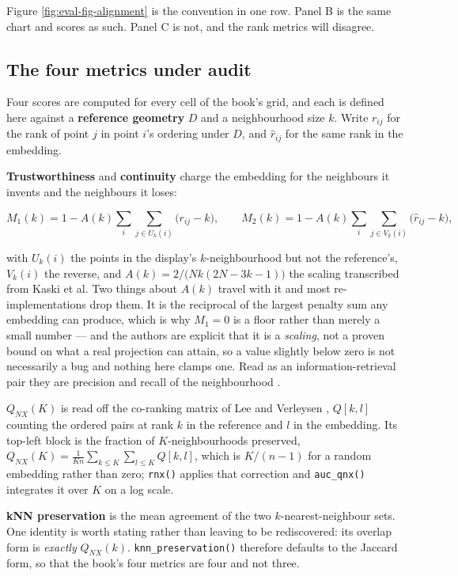 \documentclass[
  british,
  a4paper,
]{book}
\begin{document}
Figure \ref{fig:eval-fig-alignment} is the convention in one row. Panel B is
the same chart and scores as such. Panel C is not, and the rank metrics will
disagree.

\subsection{The four metrics under audit}\label{the-four-metrics-under-audit}

Four scores are computed for every cell of the book's grid, and each is defined
here against a \textbf{reference geometry} \(D\) and a neighbourhood size \(k\). Write
\(r_{ij}\) for the rank of point \(j\) in point \(i\)'s ordering under \(D\), and
\(\hat r_{ij}\) for the same rank in the embedding.

\textbf{Trustworthiness} and \textbf{continuity} \citep{venna2001neighborhood, kaski2003trustworthiness} charge the embedding for the neighbours it invents
and the neighbours it loses:

\[M_1(k) = 1 - A(k)\sum_{i}\sum_{j \in U_k(i)}\big(r_{ij} - k\big), \qquad
  M_2(k) = 1 - A(k)\sum_{i}\sum_{j \in V_k(i)}\big(\hat r_{ij} - k\big),\]

with \(U_k(i)\) the points in the display's \(k\)-neighbourhood but not the
reference's, \(V_k(i)\) the reverse, and
\(A(k) = 2 / \big(Nk(2N - 3k - 1)\big)\) the scaling transcribed from Kaski et al.
Two things about \(A(k)\) travel with it and most re-implementations drop them.
It is the reciprocal of the largest penalty sum any embedding can produce, which
is why \(M_1 = 0\) is a floor rather than merely a small number --- and the authors
are explicit that it is a \emph{scaling}, not a proven bound on what a real
projection can attain, so a value slightly below zero is not necessarily a bug
and nothing here clamps one. Read as an information-retrieval pair they are
precision and recall of the neighbourhood \citep{venna2010information}.

\textbf{\(Q_{NX}(K)\)} is read off the co-ranking matrix of Lee and Verleysen
\citep{lee2009quality}, \(Q[k, l]\) counting the ordered pairs at rank \(k\) in the
reference and \(l\) in the embedding. Its top-left block is the fraction of
\(K\)-neighbourhoods preserved,
\(Q_{NX}(K) = \frac{1}{Kn}\sum_{k \le K}\sum_{l \le K} Q[k, l]\), which is
\(K/(n-1)\) for a random embedding rather than zero; \texttt{rnx()} applies that
correction and \texttt{auc\_qnx()} integrates it over \(K\) on a log scale.

\textbf{kNN preservation} is the mean agreement of the two \(k\)-nearest-neighbour
sets. One identity is worth stating rather than leaving to be rediscovered:
its overlap form is \emph{exactly} \(Q_{NX}(k)\). \texttt{knn\_preservation()} therefore
defaults to the Jaccard form, so that the book's four metrics are four and not
three.
\end{document}
